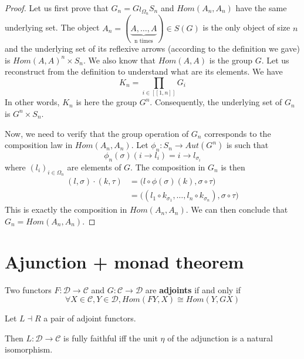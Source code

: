 \documentclass{report}
\begin{document}
\begin{proof}
    Let us first prove that $G_n = G\wr_{\Omega_n}S_n$ and $Hom(A_n,A_n)$ have the same underlying set.
    The object $A_n = (\underbrace{A,\dots,A}_\textrm{n times})\in S(G)$ is the only object of size $n$ and the underlying set of its reflexive arrows (according to the definition we gave) is $ Hom(A,A)^{n} \times S_n$. We also know that $Hom(A,A)$ is the group $G$.
    Let us reconstruct from the definition to understand what are its elements.
    We have $$K_n = \prod_{i\in [\![1,n]\!]}G_i$$
    In other words, $K_n$ is here the group $G^n$. Consequently, the underlying set of $G_n$ is $G^n\times S_n$.
    \vspace{0.5cm}

    Now, we need to verify that the group operation of $G_n$ corresponds to the composition law in $Hom(A_n,A_n)$.
    Let $\phi_n : S_n \rightarrow Aut(G^n)$ is such that $$\phi_n(\sigma)(i\rightarrow l_i) = i \rightarrow l_{\sigma_i}$$ where $(l_i)_{i\in \Omega_n}$ are elements of $G$. The composition in $G_n$ is then
    \begin{align*}
        (l,\sigma)\cdot (k,\tau) & = \big(l\circ \phi(\sigma)(k),\sigma\circ\tau\big)                                 \\
                                 & = \big((l_1 \circ k_{\sigma_1},\dots, l_n \circ k_{\sigma_n}),\sigma\circ\tau\big)
    \end{align*}
    This is exactly the composition in $Hom(A_n,A_n)$. We can then conclude that $G_n = Hom(A_n,A_n)$.

\end{proof}





\section{Ajunction + monad theorem}

\begin{defn}[Adjunction]
    Two functors $F : \mathcal{D}\rightarrow \mathcal{C}$ and $G : \mathcal{C} \rightarrow \mathcal{D}$ are \textbf{adjoints} if and only if
    $$\forall X\in \mathcal{C}, Y \in \mathcal{D}, Hom(FY,X) \cong Hom(Y,GX)$$
\end{defn}


\begin{prop}{\cite{wakamatsu1980note}}
    \label{fullSplitEpi}
    Let $L\dashv R$ a pair of adjoint functors.

    Then $L : \mathcal{D}\rightarrow \mathcal{C}$ is fully faithful iff the unit $\eta$ of the adjunction is a natural isomorphism.
\end{prop}
\end{document}
